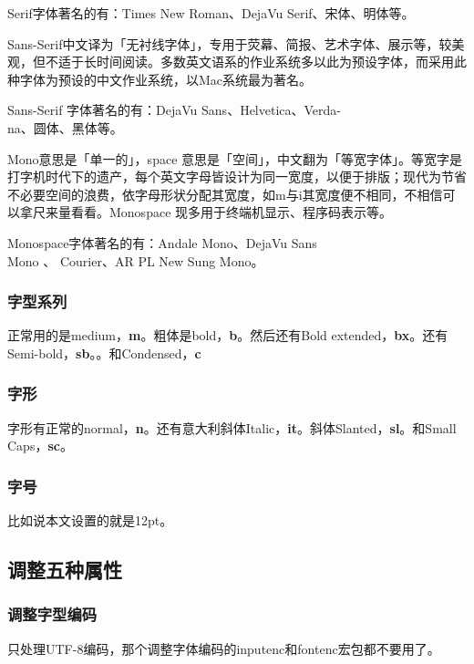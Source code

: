 \documentclass[12pt,oneside]{book}
\begin{document}
\begin{common-format}
\begin{description}
Serif字体著名的有：Times New Roman、DejaVu Serif、宋体、明体等。

\item[sans-serif] Sans-Serif中文译为「无衬线字体」，专用于荧幕、简报、艺术字体、展示等，较美观，但不适于长时间阅读。多数英文语系的作业系统多以此为预设字体，而采用此种字体为预设的中文作业系统，以Mac系统最为著名。

Sans-Serif 字体著名的有：DejaVu Sans、Helvetica、Verda-\\na、圆体、黑体等。

\item[monospace] Mono意思是「单一的」，space 意思是「空间」，中文翻为「等宽字体」。等宽字是打字机时代下的遗产，每个英文字母皆设计为同一宽度，以便于排版；现代为节省不必要空间的浪费，依字母形状分配其宽度，如m与i其宽度便不相同，不相信可以拿尺来量看看。Monospace 现多用于终端机显示、程序码表示等。

Monospace字体著名的有：Andale Mono、DejaVu Sans \\ Mono 、 Courier、AR PL New Sung Mono。
\end{description}


\subsubsection{字型系列}
正常用的是medium，\textbf{m}。粗体是bold，\textbf{b}。然后还有Bold extended，\textbf{bx}。还有Semi-bold，\textbf{sb}。。和Condensed，\textbf{c}


\subsubsection{字形}
字形有正常的normal，\textbf{n}。还有意大利斜体Italic，\textbf{it}。斜体Slanted，\textbf{sl}。和Small Caps，\textbf{sc}。


\subsubsection{字号}
比如说本文设置的就是12pt。



\subsection{调整五种属性}
\subsubsection{调整字型编码}
\XeLaTeX 只处理UTF-8编码，那个调整字体编码的inputenc和fontenc宏包都不要用了。



\end{common-format}
\end{document}
